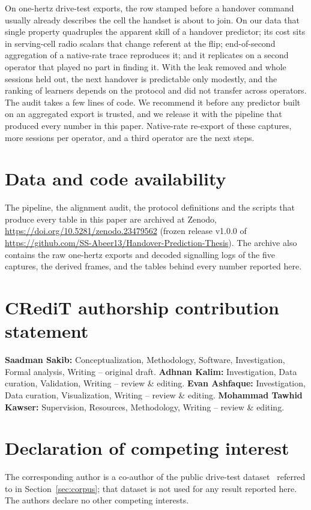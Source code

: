 \documentclass[preprint,review,12pt]{elsarticle}\usepackage{lineno}\linenumbers
\begin{document}
On one-hertz drive-test exports, the row stamped before a handover command usually already describes the cell the handset is about to join. On our data that single property quadruples the apparent skill of a handover predictor; its cost sits in serving-cell radio scalars that change referent at the flip; end-of-second aggregation of a native-rate trace reproduces it; and it replicates on a second operator that played no part in finding it. With the leak removed and whole sessions held out, the next handover is predictable only modestly, and the ranking of learners depends on the protocol and did not transfer across operators. The audit takes a few lines of code. We recommend it before any predictor built on an aggregated export is trusted, and we release it with the pipeline that produced every number in this paper. Native-rate re-export of these captures, more sessions per operator, and a third operator are the next steps.

\section*{Data and code availability}
The pipeline, the alignment audit, the protocol definitions and the scripts that produce every table in this paper are archived at Zenodo, \url{https://doi.org/10.5281/zenodo.23479562} (frozen release v1.0.0 of \url{https://github.com/SS-Abeer13/Handover-Prediction-Thesis}). The archive also contains the raw one-hertz exports and decoded signalling logs of the five captures, the derived frames, and the tables behind every number reported here.

\section*{CRediT authorship contribution statement}
\textbf{Saadman Sakib:} Conceptualization, Methodology, Software, Investigation, Formal analysis, Writing -- original draft. \textbf{Adhnan Kalim:} Investigation, Data curation, Validation, Writing -- review \& editing. \textbf{Evan Ashfaque:} Investigation, Data curation, Visualization, Writing -- review \& editing. \textbf{Mohammad Tawhid Kawser:} Supervision, Resources, Methodology, Writing -- review \& editing.

\section*{Declaration of competing interest}
The corresponding author is a co-author of the public drive-test dataset~\cite{ref38} referred to in Section~\ref{sec:corpus}; that dataset is not used for any result reported here. The authors declare no other competing interests.
\end{document}
